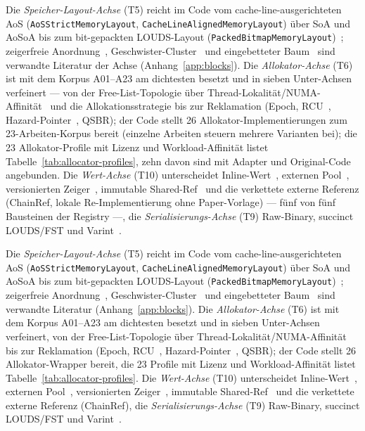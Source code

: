 \begin{nurlang}
Die \emph{Speicher-Layout-Achse} (T5) reicht im Code vom cache-line-ausgerichteten AoS
(\texttt{AoS\allowbreak{}Strict\allowbreak{}Memory\allowbreak{}Layout},
\texttt{Cache\allowbreak{}Line\allowbreak{}Aligned\allowbreak{}Memory\allowbreak{}Layout}) über SoA und AoSoA bis zum
bit-gepackten LOUDS-Layout
(\texttt{Packed\allowbreak{}Bitmap\allowbreak{}Memory\allowbreak{}Layout})~\cite{jacobson1989louds}; zeigerfreie
Anordnung~\cite{rao1999css}, Geschwister-Cluster~\cite{rao2000csb} und eingebetteter
Baum~\cite{schmeisser2022b2tree} sind verwandte Literatur der Achse (Anhang~\ref{app:blocks}). Die
\emph{Allokator-Achse} (T6) ist mit dem Korpus A01--A23 am dichtesten besetzt und in sieben Unter-Achsen
verfeinert --- von der Free-List-Topologie über Thread-Lokalität/NUMA-Affinität~\cite{ungethuem2017survey}
und die Allokationsstrategie bis zur Reklamation (Epoch, RCU~\cite{mckenney2001rcu},
Hazard-Pointer~\cite{michael2004hazard}, QSBR); der Code stellt 26 Allokator-Implementierungen zum
23-Arbeiten-Korpus bereit (einzelne Arbeiten steuern mehrere Varianten bei); die 23 Allokator-Profile
mit Lizenz und Workload-Affinität listet Tabelle~\ref{tab:allocator-profiles}, zehn davon sind mit
Adapter und Original-Code angebunden. Die \emph{Wert-Achse} (T10) unterscheidet Inline-Wert~\cite{leis2013art}, externen
Pool~\cite{wu2019wormhole}, versionierten Zeiger~\cite{mao2012masstree}, immutable
Shared-Ref~\cite{mckenney2001rcu} und die verkettete externe Referenz (ChainRef, lokale Re-Implementierung
ohne Paper-Vorlage) --- fünf von fünf Bausteinen der Registry ---, die \emph{Serialisierungs-Achse} (T9)
Raw-Binary, succinct LOUDS/FST und
Varint~\cite{leis2013art}.
\end{nurlang}
\begin{nurkurz}
Die \emph{Speicher-Layout-Achse} (T5) reicht im Code vom cache-line-ausgerichteten AoS
(\texttt{AoS\allowbreak{}Strict\allowbreak{}Memory\allowbreak{}Layout},
\texttt{Cache\allowbreak{}Line\allowbreak{}Aligned\allowbreak{}Memory\allowbreak{}Layout}) über SoA und AoSoA bis
zum bit-gepackten LOUDS-Layout
(\texttt{Packed\allowbreak{}Bitmap\allowbreak{}Memory\allowbreak{}Layout})~\cite{jacobson1989louds}; zeigerfreie
Anordnung~\cite{rao1999css}, Geschwister-Cluster~\cite{rao2000csb} und eingebetteter
Baum~\cite{schmeisser2022b2tree} sind verwandte Literatur (Anhang~\ref{app:blocks}). Die \emph{Allokator-Achse}
(T6) ist mit dem Korpus A01--A23 am dichtesten besetzt und in sieben Unter-Achsen verfeinert, von der
Free-List-Topologie über Thread-Lokalität/NUMA-Affinität~\cite{ungethuem2017survey} bis zur Reklamation (Epoch,
RCU~\cite{mckenney2001rcu}, Hazard-Pointer~\cite{michael2004hazard}, QSBR); der Code stellt 26 Allokator-Wrapper
bereit, die 23 Profile mit Lizenz und Workload-Affinität listet Tabelle~\ref{tab:allocator-profiles}. Die
\emph{Wert-Achse} (T10) unterscheidet Inline-Wert~\cite{leis2013art}, externen Pool~\cite{wu2019wormhole},
versionierten Zeiger~\cite{mao2012masstree}, immutable Shared-Ref~\cite{mckenney2001rcu} und die verkettete
externe Referenz (ChainRef), die \emph{Serialisierungs-Achse} (T9) Raw-Binary, succinct LOUDS/FST und
Varint~\cite{leis2013art}.
\end{nurkurz}

